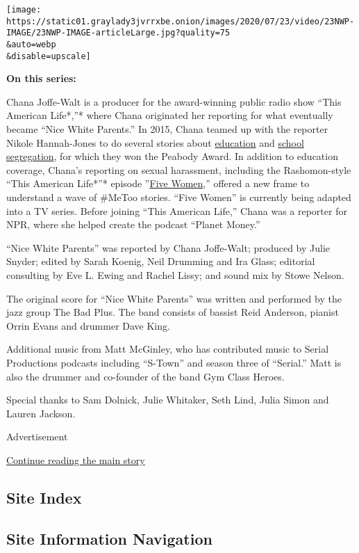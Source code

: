 \texttt{[image: https://static01.graylady3jvrrxbe.onion/images/2020/07/23/video/23NWP-IMAGE/23NWP-IMAGE-articleLarge.jpg?quality=75\\\&auto=webp\\\&disable=upscale]}

\textbf{On this series:}

Chana Joffe-Walt is a producer for the award-winning public radio show
``This American Life*,''* where Chana originated her reporting for what
eventually became ``Nice White Parents.'' In 2015, Chana teamed up with
the reporter Nikole Hannah-Jones to do several stories about
\href{https://www.thisamericanlife.org/550/three-miles}{education} and
\href{https://www.thisamericanlife.org/562/the-problem-we-all-live-with-part-one}{school
segregation}, for which they won the Peabody Award. In addition to
education coverage, Chana's reporting on sexual harassment, including
the Rashomon-style ``This American Life*''* episode
''\href{https://www.thisamericanlife.org/640/five-women}{Five Women},''
offered a new frame to understand a wave of \#MeToo stories. ``Five
Women'' is currently being adapted into a TV series. Before joining
``This American Life,'' Chana was a reporter for NPR, where she helped
create the podcast ``Planet Money.''

``Nice White Parents'' was reported by Chana Joffe-Walt; produced by
Julie Snyder; edited by Sarah Koenig, Neil Drumming and Ira Glass;
editorial consulting by Eve L. Ewing and Rachel Lissy; and sound mix by
Stowe Nelson.

The original score for ``Nice White Parents'' was written and performed
by the jazz group The Bad Plus. The band consists of bassist Reid
Anderson, pianist Orrin Evans and drummer Dave King.

Additional music from Matt McGinley, who has contributed music to Serial
Productions podcasts including ``S-Town'' and season three of
``Serial.'' Matt is also the drummer and co-founder of the band Gym
Class Heroes.

Special thanks to Sam Dolnick, Julie Whitaker, Seth Lind, Julia Simon
and Lauren Jackson.

Advertisement

\protect\hyperlink{after-bottom}{Continue reading the main story}

\hypertarget{site-index}{%
\subsection{Site Index}\label{site-index}}

\hypertarget{site-information-navigation}{%
\subsection{Site Information
Navigation}\label{site-information-navigation}}

